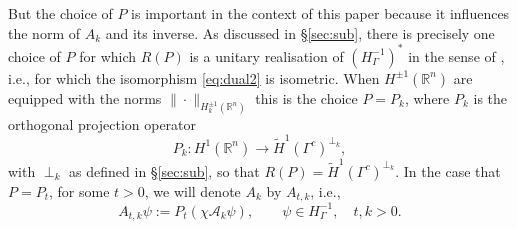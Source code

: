 \documentclass{birkjour}
\theoremstyle{definition}
\theoremstyle{remark}
\numberwithin{equation}{section}
\newcommand{\R}{\mathbb{R}}
\begin{document}
But the choice of $P$ is important in the context of this paper because it influences the norm of $A_k$ and its inverse. As discussed in \S\ref{sec:sub}, there is precisely  one choice of $P$ for which $R(P)$ is a unitary realisation of $(H^{-1}_\Gamma)^*$ in the sense of  \cite[\S2.1]{ChHeMo:17}, i.e., for which the isomorphism \eqref{eq:dual2} is isometric. When $H^{\pm 1}(\R^n)$ are equipped with the norms $\|\cdot\|_{H_k^{\pm 1}(\R^n)}$ this is the choice $P=P_k$, where $P_k$ is the orthogonal projection operator
$$
P_k:H^1(\R^n)\to \widetilde H^{1}(\Gamma^c)^{\perp_k}, %
$$
with $\perp_k$ as defined in \S\ref{sec:sub}, so that $R(P)=\widetilde H^{1}(\Gamma^c)^{\perp_k}$.
In the case that $P=P_t$, for some $t>0$, we will denote $A_k$ by $A_{t,k}$, i.e.,
\begin{equation} \label{eq:Akdef}
A_{t,k}\psi:=P_t(\chi \mathcal{A}_k\psi), \qquad \psi \in H^{-1}_\Gamma, \quad t,k>0.
\end{equation}
\end{document}
